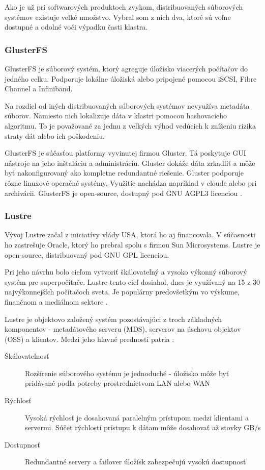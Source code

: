Ako je už pri softwarových produktoch zvykom, distribuovaných súborových systémov existuje veľké množstvo. Vybral som z nich dva, ktoré sú voľne dostupné a odolné voči výpadku časti klastra.

\subsubsection{GlusterFS}
GlusterFS je súborový systém, ktorý agreguje úložisko viacerých počítačov do jedného celku. Podporuje lokálne úložiská alebo pripojené pomocou iSCSI, Fibre Channel a Infiniband.

Na rozdiel od iných distribuovaných súborových systémov nevyužíva metadáta súborov. Namiesto nich lokalizuje dáta v klastri pomocou hashovacieho algoritmu. To je považované za jednu z veľkých výhod vedúcich k zníženiu rizika straty dát alebo ich poškodeniu.

GlusterFS je súčasťou platformy vyvinutej firmou Gluster. Tá poskytuje GUI nástroje na jeho inštaláciu a administráciu. Gluster dokáže dáta zrkadliť a môže byť nakonfigurovaný ako kompletne redundantné riešenie. Gluster podporuje rôzne linuxové operačné systémy. Využitie nachádza napríklad v cloude alebo pri archivácii. GlusterFS je open-source, dostupný pod GNU AGPL3 licenciou \cite{pdf:gluster}.

\subsubsection{Lustre}
Vývoj Lustre začal z iniciatívy vlády USA, ktorá ho aj financovala. V súčasnosti ho zastrešuje Oracle, ktorý ho prebral spolu s firmou Sun Microsystems. Lustre je open-source, distribuovaný pod GNU GPL licenciou.

Pri jeho návrhu bolo cieľom vytvoriť škálovateľný a vysoko výkonný súborový systém pre superpočítače. Lustre tento cieľ dosiahol, dnes je využívaný na 15 z 30 najvýkonnejších počítačoch sveta. Je populárny predovšetkým vo výskume, finančnom a mediálnom sektore \cite{pdf:lustre}.

Lustre je objektovo založený systém pozostávajúci z troch základných komponentov - metadátového serveru (MDS), serverov na úschovu objektov (OSS) a klientov. Medzi jeho hlavné prednosti patria \cite{web:lustre}:
\begin{description}
	\item[Škálovateľnosť] Rozšírenie súborového systému je jednoduché - úložisko môže byť pridávané podľa potreby prostredníctvom LAN alebo WAN
	\item[Rýchlosť] Vysoká rýchlosť je dosahovaná paralelným prístupom medzi klientami a servermi. Súčet rýchlostí prístupu k dátam môže dosahovať až stovky GB/s
	\item[Dostupnosť] Redundantné servery a failover úložísk zabezpečujú vysokú dostupnosť
\end{description}

